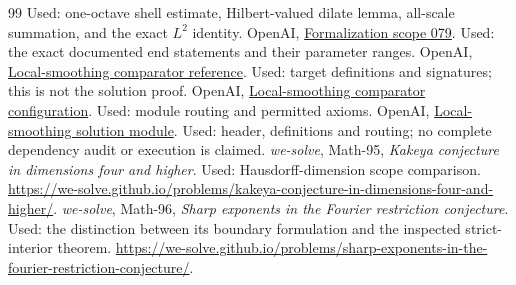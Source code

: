 \documentclass[11pt,a4paper]{article}
\numberwithin{equation}{section}
\theoremstyle{definition}
\theoremstyle{remark}
\begin{document}
\begin{thebibliography}{99}
Used: one-octave shell estimate, Hilbert-valued dilate lemma, all-scale summation,
and the exact $L^2$ identity.
 OpenAI,
\href{https://github.com/openai/math/blob/7ef5c0cc5ca4b0e072b7a050fca09ab24bc6fa3a/lean/docs/079.md}{Formalization scope 079}.
Used: the exact documented end statements and their parameter ranges.
 OpenAI,
\href{https://github.com/openai/math/blob/7ef5c0cc5ca4b0e072b7a050fca09ab24bc6fa3a/lean/ComparatorChallenges/LocalSmoothing.lean}{Local-smoothing comparator reference}.
Used: target definitions and signatures; this is not the solution proof.
 OpenAI,
\href{https://github.com/openai/math/blob/7ef5c0cc5ca4b0e072b7a050fca09ab24bc6fa3a/lean/ComparatorChallenges/LocalSmoothing.json}{Local-smoothing comparator configuration}.
Used: module routing and permitted axioms.
 OpenAI,
\href{https://github.com/openai/math/blob/7ef5c0cc5ca4b0e072b7a050fca09ab24bc6fa3a/lean/OAI/Analysis/Fourier/LocalSmoothing/Comparator.lean}{Local-smoothing solution module}.
Used: header, definitions and routing; no complete dependency audit or execution
is claimed.
 \emph{we-solve}, Math-95,
\emph{Kakeya conjecture in dimensions four and higher}.
Used: Hausdorff-dimension scope comparison.
\url{https://we-solve.github.io/problems/kakeya-conjecture-in-dimensions-four-and-higher/}.
 \emph{we-solve}, Math-96,
\emph{Sharp exponents in the Fourier restriction conjecture}.
Used: the distinction between its boundary formulation and the inspected
strict-interior theorem.
\url{https://we-solve.github.io/problems/sharp-exponents-in-the-fourier-restriction-conjecture/}.
\end{thebibliography}
\end{document}
